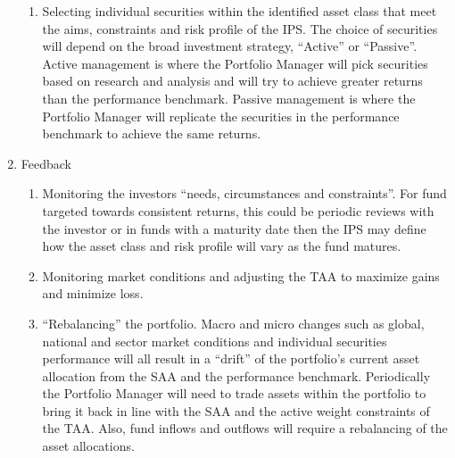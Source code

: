 \documentclass[oneside,12pt]{Classes/RoboticsLaTeX}
\begin{document}
\begin{enumerate}
\begin{enumerate}
    \item Selecting individual securities within the identified asset class that meet the aims, constraints and risk profile of the IPS. The choice of securities will depend on the broad investment strategy, “Active” or “Passive”. Active management is where the Portfolio Manager will pick securities based on research and analysis and will try to achieve greater returns than the performance benchmark. Passive management is where the Portfolio Manager will replicate the securities in the performance benchmark to achieve the same returns.
    \end{enumerate}
\item Feedback \citep[p.3]{BakerH.Kent2013PTaM}
    \begin{enumerate}
    \item Monitoring the investors “needs, circumstances and constraints”. For fund targeted towards consistent returns, this could be periodic reviews with the investor or in funds with a maturity date then the IPS may define how the asset class and risk profile will vary as the fund matures.
    \item Monitoring market conditions and adjusting the TAA to maximize gains and minimize loss.
    \item “Rebalancing” the portfolio.  Macro and micro changes such as global, national and sector market conditions and individual securities performance will all result in a “drift” of the portfolio’s current asset allocation from the SAA and the performance benchmark.  Periodically the Portfolio Manager will need to trade assets within the portfolio to bring it back in line with the SAA and the active weight constraints of the TAA.  Also, fund inflows and outflows will require a rebalancing of the asset allocations.
    \end{enumerate}
\end{enumerate}
\end{document}
